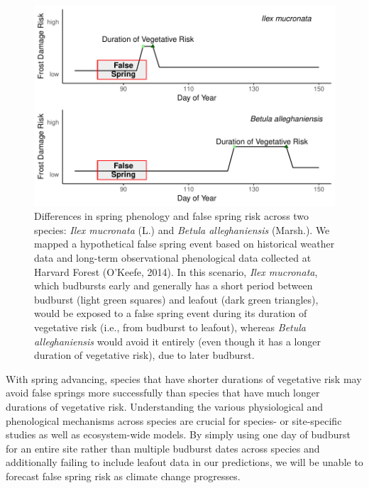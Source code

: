 \documentclass{article}\usepackage[]{graphicx}\usepackage[]{color}
\makeatletter
\def\maxwidth{ %
  \ifdim\Gin@nat@width>\linewidth
    \linewidth
  \else
    \Gin@nat@width
  \fi
}
\makeatother
\begin{document}
\begin{figure}[H]

{\centering \includegraphics[width=\maxwidth]{figure/risk-1} 

}

\caption{Differences in spring phenology and false spring risk across two species: \textit{Ilex mucronata} (L.) and \textit{Betula alleghaniensis} (Marsh.). We mapped a hypothetical false spring event based on historical weather data and long-term observational phenological data collected at Harvard Forest (O'Keefe, 2014). In this scenario, \textit{Ilex mucronata}, which budbursts early and generally has a short period between budburst (light green squares) and leafout (dark green triangles), would be exposed to a false spring event during its duration of vegetative risk (i.e., from budburst to leafout), whereas \textit{Betula alleghaniensis} would avoid it entirely (even though it has a longer duration of vegetative risk), due to later budburst.}\label{fig:risk}
\end{figure}



With spring advancing, species that have shorter durations of vegetative risk may avoid false springs more successfully than species that have much longer durations of vegetative risk. Understanding the various physiological and phenological mechanisms across species are crucial for species- or site-specific studies as well as ecosystem-wide models. By simply using one day of budburst for an entire site rather than multiple budburst dates across species and additionally failing to include leafout data in our predictions, we will be unable to forecast false spring risk as climate change progresses. 
\end{document}
